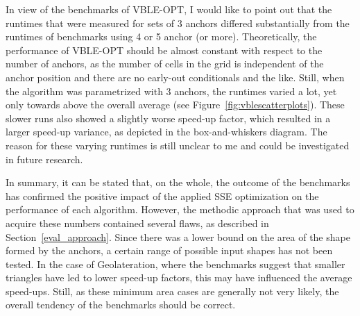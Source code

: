 In view of the benchmarks of VBLE-OPT, I would like to point out that the runtimes that were measured for sets of 3 anchors differed substantially from the runtimes of benchmarks using 4 or 5 anchor (or more). Theoretically, the performance of VBLE-OPT should be almost constant with respect to the number of anchors, as the number of cells in the grid is independent of the anchor position and there are no early-out conditionals and the like. Still, when the algorithm was parametrized with 3 anchors, the runtimes varied a lot, yet only towards above the overall average (see Figure~\ref{fig:vblescatterplots}). These slower runs also showed a slightly worse speed-up factor, which resulted in a larger speed-up variance, as depicted in the box-and-whiskers diagram. The reason for these varying runtimes is still unclear to me and could be investigated in future research.

In summary, it can be stated that, on the whole, the outcome of the benchmarks has confirmed the positive impact of the applied SSE optimization on the performance of each algorithm. However, the methodic approach that was used to acquire these numbers contained several flaws, as described in Section~\ref{eval_approach}. Since there was a lower bound on the area of the shape formed by the anchors, a certain range of possible input shapes has not been tested. In the case of Geolateration, where the benchmarks suggest that smaller triangles have led to lower speed-up factors, this may have influenced the average speed-ups. Still, as these minimum area cases are generally not very likely, the overall tendency of the benchmarks should be correct.
